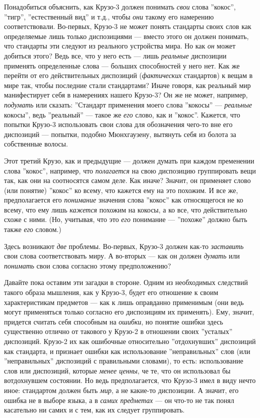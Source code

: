 \documentclass[11pt]{book}
\begin{document}
Понадобиться объяснить, как Крузо-3 должен понимать \textit{свои} слова ''кокос'', ''тигр'', ''естественный вид'' и т.д., чтобы \textit{они} такому его намерению соответствовали. Во-первых, Крузо-3 не может понять стандарты своих слов как определяемые лишь только диспозициями --- вместо этого он должен понимать, что стандарты эти следуют из реального устройства мира. Но как \textit{он} может добиться этого? Ведь все, что у него есть --- лишь \textit{реальные} диспозиции применять определенные слова --- больших способностей у него нет. Как же перейти от его действительных диспозиций (\textit{фактических} стандартов) к вещам в мире так, чтобы последние стали стандартами? Иначе говоря, как реальный мир манифестирует себя в намерениях нашего Крузо-3? Он же не может, например, \textit{подумать} или сказать: ''Стандарт применения моего слова ''кокосы'' --- \textit{реальные} кокосы'', ведь ''реальный'' --- такое же \textit{его} слово, как и ''кокос''. Кажется, что попытки Крузо-3 использовать свои слова для обозначения чего-то вне его диспозиций --- попытки, подобно Мюнхгаузену, вытянуть себя из болота за собственные волосы.

Этот третий Крузо, как и предыдущие --- должен думать при каждом пременении слова ''кокос'', например, что \textit{полагается} на свою диспозицию группировать вещи так, как они на соотносятся самом деле. Как иначе? Значит, он применяет слово (или понятие) ''кокос'' ко всему, что кажется ему на это похожим. И все же, предполагается его \textit{понимание} значения слова ''кокос'' как относящегося не ко всему, что ему лишь \textit{кажется} похожим на кокосы, а ко все, что действительно схоже с ними. (Но, учитывая, что это \textit{его} понимание --- ''похоже'' должно быть также \textit{его} словом.)

Здесь возникают \textit{две} проблемы. Во-первых, Крузо-3 должен как-то \textit{заставить} свои слова соответствовать миру. А во-вторых --- как он должен \textit{думать} или \textit{понимать} свои слова согласно этому предположению?

Давайте пока оставим эти загадки в стороне. Одним из необходимых следствий такого образа мышления, как у Крузо-3, будет его отношение к своим характеристикам предметов --- как к лишь оправданно применимым (они ведь могут применяться только согласно его диспозициям их применять). Ему, значит, придется считать себя способным на \textit{ошибки}, но понятие ошибки здесь существенно отлично от такового у Крузо-2 в отношении своих ''усталых'' диспозиций. Крузо-2 их как ошибочные относительно ''отдохнувших'' диспозиций как стандарта, и признает ошибки как использование ''неправильных'' слов (или ''неправильных'' диспозиций с правильными словами), то есть: использование слов или диспозиций, которые \textit{менее ценны}, че те, что он использовал бы вотдохнувшем состоянии. Но ведь предполагается, что Крузо-3 имел в виду нечто иное: стандартом должен быть \textit{мир}, а не какие-то диспозиции. А значит, его ошибка не в выборе языка, а в \textit{самих предметах} --- он что-то не так понял касательно ни самих и с тем, как их следует группировать.
\end{document}
